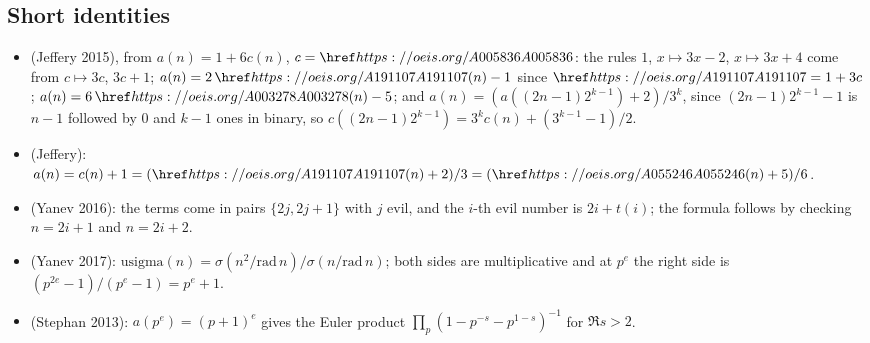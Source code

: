 \subsection{Short identities}\label{s:small}
\begin{itemize}
\item {} (Jeffery 2015), from $a(n)=1+6c(n)$, $c=\oeis{A005836}$: the rules $1$, $x\mapsto3x-2$,
  $x\mapsto3x+4$ come from $c\mapsto3c$, $3c+1$; $a(n)=2\,\oeis{A191107}(n)-1$ since $\oeis{A191107}=1+3c$;
  $a(n)=6\,\oeis{A003278}(n)-5$; and $a(n)=(a((2n-1)2^{k-1})+2)/3^k$, since $(2n-1)2^{k-1}-1$ is $n-1$ followed by
  $0$ and $k-1$ ones in binary, so $c((2n-1)2^{k-1})=3^kc(n)+(3^{k-1}-1)/2$.
\item {} (Jeffery): $a(n)=c(n)+1=(\oeis{A191107}(n)+2)/3=(\oeis{A055246}(n)+5)/6$.
\item {} (Yanev 2016): the terms come in pairs $\{2j,2j+1\}$ with $j$ evil, and the $i$-th evil number is
  $2i+t(i)$; the formula follows by checking $n=2i+1$ and $n=2i+2$.
\item {} (Yanev 2017): $\mathrm{usigma}(n)=\sigma(n^2/\mathrm{rad}\,n)/\sigma(n/\mathrm{rad}\,n)$; both sides
  are multiplicative and at $p^e$ the right side is $(p^{2e}-1)/(p^e-1)=p^e+1$.
\item {} (Stephan 2013): $a(p^e)=(p+1)^e$ gives the Euler product
  $\prod_p(1-p^{-s}-p^{1-s})^{-1}$ for $\Re s>2$.
\end{itemize}

